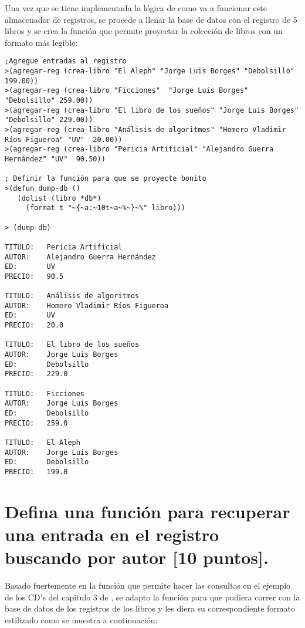 \documentclass[11pt, letterpaper]{article}
\begin{document}
Una vez que se tiene implementada la lógica de como va a funcionar este almacenador de registros, se procede a llenar la base de datos con el registro de 5 libros y se crea la función que permite proyectar la colección de libros con un formato más legible:

\begin{itemize}
	\begin{verbatim}
;Agregue entradas al registro 
>(agregar-reg (crea-libro "El Aleph" "Jorge Luis Borges" "Debolsillo" 199.00))
>(agregar-reg (crea-libro "Ficciones"  "Jorge Luis Borges" "Debolsillo" 259.00))
>(agregar-reg (crea-libro "El libro de los sueños" "Jorge Luis Borges" "Debolsillo" 229.00))
>(agregar-reg (crea-libro "Análisis de algoritmos" "Homero Vladimir Ríos Figueroa" "UV"  20.00))
>(agregar-reg (crea-libro "Pericia Artificial" "Alejandro Guerra Hernández" "UV"  90.50))

; Definir la función para que se proyecte bonito
>(defun dump-db ()
   (dolist (libro *db*)
     (format t "~{~a:~10t~a~%~}~%" libro)))

> (dump-db)

TITULO:   Pericia Artificial
AUTOR:    Alejandro Guerra Hernández
ED:       UV
PRECIO:   90.5

TITULO:   Análisis de algoritmos
AUTOR:    Homero Vladimir Ríos Figueroa
ED:       UV
PRECIO:   20.0

TITULO:   El libro de los sueños
AUTOR:    Jorge Luis Borges
ED:       Debolsillo
PRECIO:   229.0

TITULO:   Ficciones
AUTOR:    Jorge Luis Borges
ED:       Debolsillo
PRECIO:   259.0

TITULO:   El Aleph
AUTOR:    Jorge Luis Borges
ED:       Debolsillo
PRECIO:   199.0

	\end{verbatim}
\end{itemize}




\newpage

\section{Defina una función para recuperar una entrada en el registro buscando por autor [10 puntos].}

Basado fuertemente en la función que permite hacer las consultas en el ejemplo de los CD's del capitulo 3 de \cite{seibel2006}, se adapto la función para que pudiera correr con la base de datos de los registros de los libros y les diera su correspondiente formato estilizado como se muestra a continuación:
\end{document}
